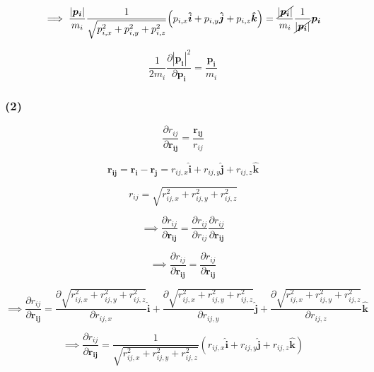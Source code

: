\documentclass{article}
\begin{document}
\begin{equation}
\implies \frac{|\boldsymbol{p_{i}}|}{m_{i}} \frac{1}{\sqrt{p_{i,x}^2 + p_{i,y}^2 + p_{i,z}^2}} \Big( p_{i,x} \boldsymbol{\hat i} + p_{i,y} \boldsymbol{\hat j} + p_{i,z} \boldsymbol{\hat k} \Big) = \frac{\cancel{|\boldsymbol{p_{i}}|}}{m_{i}} \frac{1}{\cancel{|\boldsymbol{p_{i}}|}} \boldsymbol{p_{i}}
\end{equation}

\begin{equation}
\boxed{ \frac{1}{2m_{i}}\frac{\partial|\boldsymbol{p_{i}}|^2}{\partial\boldsymbol{p_{i}}} = \frac{\boldsymbol{p_{i}}}{m_{i}} }
\end{equation}

\subsubsection{(2)}
\label{sec-1-1-2}
\begin{equation}
\frac{\partial r_{ij}}{\partial \boldsymbol{r_{ij}}} = \frac{\boldsymbol{r_{ij}}}{r_{ij}}
\end{equation}

$$ \boldsymbol{r_{ij}} = \boldsymbol{r_{i}} - \boldsymbol{r_{j}} = r_{ij,x}\boldsymbol{\hat i} + r_{ij,y}\boldsymbol{\hat j} + r_{ij,z}\boldsymbol{\hat k} $$

$$ r_{ij} = \sqrt{r_{ij,x}^2 + r_{ij,y}^2 + r_{ij,z}^2} $$

\begin{equation}
\implies \frac{\partial r_{ij}}{\partial \boldsymbol{r_{ij}}} = \frac{\partial r_{ij}}{\partial r_{ij}} \frac{\partial r_{ij}}{\partial \boldsymbol{r_{ij}}}
\end{equation}

\begin{equation}
\implies \frac{\partial r_{ij}}{\partial \boldsymbol{r_{ij}}} = \frac{\partial r_{ij}}{\partial \boldsymbol{r_{ij}}}
\end{equation}

\begin{equation}
\implies \frac{\partial r_{ij}}{\partial \boldsymbol{r_{ij}}} = \frac{\partial \sqrt{r_{ij,x}^2 + r_{ij,y}^2 + r_{ij,z}^2}}{\partial r_{ij,x}} \boldsymbol{\hat i} + \frac{\partial \sqrt{r_{ij,x}^2 + r_{ij,y}^2 + r_{ij,z}^2}}{\partial r_{ij,y}} \boldsymbol{\hat j} + \frac{\partial \sqrt{r_{ij,x}^2 + r_{ij,y}^2 + r_{ij,z}^2}}{\partial r_{ij,z}} \boldsymbol{\hat k}
\end{equation}

\begin{equation}
\implies \frac{\partial r_{ij}}{\partial \boldsymbol{r_{ij}}} = \frac{1}{\sqrt{r_{ij,x}^2 + r_{ij,y}^2 + r_{ij,z}^2}} (r_{ij,x} \boldsymbol{\hat i} + r_{ij,y} \boldsymbol{\hat j} + r_{ij,z} \boldsymbol{\hat k})
\end{equation}
\end{document}
